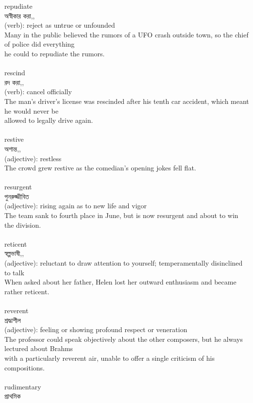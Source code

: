 \documentclass{article}
\begin{document}
{repudiate}\\
{অস্বীকার করা,,}\\
{(verb): reject as untrue or unfounded\\Many in the public believed the rumors of a UFO crash outside town, so the chief of police did everything\\he could to repudiate the rumors.\\}\\
{rescind}\\
{রদ করা,,}\\
{(verb): cancel officially\\The man's driver's license was rescinded after his tenth car accident, which meant he would never be\\allowed to legally drive again.\\}\\
{restive}\\
{অশান্ত,,}\\
{(adjective): restless\\The crowd grew restive as the comedian's opening jokes fell flat.\\}\\
{resurgent}\\
{পুনরুজ্জীবিত}\\
{(adjective): rising again as to new life and vigor\\The team sank to fourth place in June, but is now resurgent and about to win the division.\\}\\
{reticent}\\
{স্বল্পভাষী,,}\\
{(adjective): reluctant to draw attention to yourself; temperamentally disinclined to talk\\When asked about her father, Helen lost her outward enthusiasm and became rather reticent.\\}\\
{reverent}\\
{শ্রদ্ধাশীল}\\
{(adjective): feeling or showing profound respect or veneration\\The professor could speak objectively about the other composers, but he always lectured about Brahms\\with a particularly reverent air, unable to offer a single criticism of his compositions.\\}\\
{rudimentary}\\
{প্রাথমিক}\\
\end{document}
